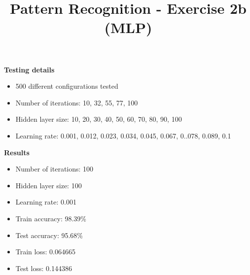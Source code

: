 \documentclass[10pt,a4paper,fullpage]{article}
\begin{document}
\title{Pattern Recognition - Exercise 2b (MLP)}
\author{}
\predate{}
\postdate{}
\date{\vspace{-5ex}}
\maketitle




\textbf{Testing details} 
\begin{itemize}
	\item 500 different configurations tested
	\item Number of iterations: 10, 32, 55, 77, 100
	\item Hidden layer size: 10, 20, 30, 40, 50, 60, 70, 80, 90, 100
	\item Learning rate: 0.001, 0.012, 0.023, 0.034, 0.045, 0.067, 0..078, 0.089, 0.1
\end{itemize}

\textbf{Results}
\begin{itemize}
	\item Number of iterations: 100
	\item Hidden layer size: 100
	\item Learning rate: 0.001
	\item Train accuracy: 98.39\%
	\item Test accuracy: 95.68\%
	\item Train loss: 0.064665
	\item Test loss: 0.144386
\end{itemize}
\end{document}
